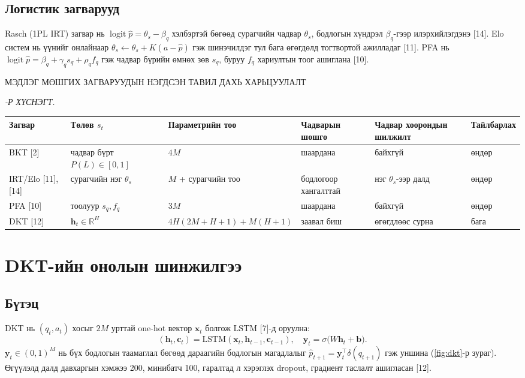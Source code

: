 \documentclass[10pt,twocolumn]{article}
\newcommand{\tabtitle}[1]{\refstepcounter{table}%
  {\centering\small\MakeUppercase{#1}\par}%
  {\raggedleft\small\itshape\thetable-Р ХҮСНЭГТ.\par}\vspace{2pt}}
\newcommand{\x}{\mathbf{x}}
\newcommand{\h}{\mathbf{h}}
\newcommand{\y}{\mathbf{y}}
\begin{document}
\subsection{Логистик загварууд}
Rasch (1PL IRT) загвар нь $\operatorname{logit}\hat p=\theta_s-\beta_q$ хэлбэртэй бөгөөд
сурагчийн чадвар $\theta_s$, бодлогын хүндрэл $\beta_q$-гээр илэрхийлэгдэнэ [14]. Elo систем
нь үүнийг онлайнаар $\theta_s\leftarrow\theta_s+K(a-\hat p)$ гэж шинэчилдэг тул бага өгөгдөлд
тогтвортой ажилладаг [11]. PFA нь $\operatorname{logit}\hat p=\beta_q+\gamma_q s_q+\rho_q f_q$
гэж чадвар бүрийн өмнөх зөв $s_q$, буруу $f_q$ хариултын тоог ашиглана [10].

\begin{table}[t]
\tabtitle{Мэдлэг мөшгих загваруудын нэгдсэн тавил дахь харьцуулалт}
\centering\small\setlength{\tabcolsep}{4pt}
\begin{tabular}{|L{1.8cm}|L{3.0cm}|L{3.8cm}|L{2.4cm}|L{2.8cm}|L{1.9cm}|}
\hline
\textbf{Загвар} & \textbf{Төлөв $s_t$} & \textbf{Параметрийн тоо} &
\textbf{Чадварын шошго} & \textbf{Чадвар хоорондын шилжилт} & \textbf{Тайлбарлах}\\\hline
BKT [2] & чадвар бүрт $P(L)\in[0,1]$ & $4M$ & шаардана & байхгүй & өндөр\\\hline
IRT/Elo [11], [14] & сурагчийн нэг $\theta_s$ & $M$ + сурагчийн тоо & бодлогоор хангалттай &
нэг $\theta_s$-ээр далд & өндөр\\\hline
PFA [10] & тоолуур $s_q,f_q$ & $3M$ & шаардана & байхгүй & өндөр\\\hline
DKT [12] & $\h_t\in\mathbb R^{H}$ & $4H(2M{+}H{+}1)+M(H{+}1)$ & заавал биш &
өгөгдлөөс сурна & бага\\\hline
\end{tabular}
\end{table}

\section{DKT-ийн онолын шинжилгээ}

\subsection{Бүтэц}
DKT нь $(q_t,a_t)$ хосыг $2M$ урттай one-hot вектор $\x_t$ болгож LSTM [7]-д оруулна:
\begin{equation}
(\h_t,\mathbf c_t)=\mathrm{LSTM}(\x_t,\h_{t-1},\mathbf c_{t-1}),\quad
\y_t=\sigma\bigl(W\h_t+\mathbf b\bigr).
\end{equation}
$\y_t\in(0,1)^M$ нь бүх бодлогын таамаглал бөгөөд дараагийн бодлогын магадлалыг
$\hat p_{t+1}=\y_t^{\top}\delta(q_{t+1})$ гэж уншина (\ref{fig:dkt}-р зураг). Өгүүлэлд далд давхаргын хэмжээ
200, минибатч 100, гаралтад л хэрэглэх dropout, градиент таслалт ашигласан [12].
\end{document}
